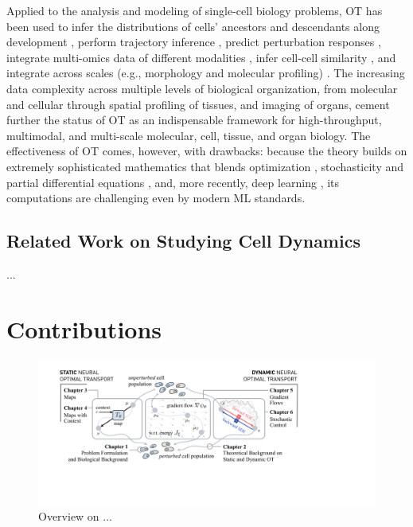 Applied to the analysis and modeling of single-cell biology problems, OT has been used to infer the distributions of cells' ancestors and descendants along development \citep{schiebinger2019optimal}, perform trajectory inference \citep{bunne2022proximal, forrow2021lineageot, bunne2022recovering, lavenant2021towards, schiebinger2019optimal, tong2020trajectorynet, yang2020predicting, zhang2021optimal, chizat2022trajectory}, predict perturbation responses \citep{bunne2021learning, yang2018scalable, lubeck2022neural}, integrate multi-omics data of different modalities \citep{demetci2022scot}, infer cell-cell similarity \citep{huizing2022optimal}, and integrate across scales (e.g., morphology and molecular profiling) \citep{yang2021multi}. The increasing data complexity across multiple levels of biological organization, from molecular and cellular through spatial profiling \citep{moriel2021novosparc} of tissues, and imaging of organs, cement further the status of OT as an indispensable framework for high-throughput, multimodal, and multi-scale molecular, cell, tissue, and organ biology. The effectiveness of OT comes, however, with drawbacks: because the theory builds on extremely sophisticated mathematics that blends optimization \citep{cuturi2013sinkhorn, cuturi2022optimal}, stochasticity \citep{chizat2022trajectory, bunne2022recovering} and partial differential equations \citep{bunne2022proximal}, and, more recently, deep learning \citep{tong2020trajectorynet, bunne2021learning, bunne2022supervised, yang2018scalable, lubeck2022neural, yang2021multi}, its computations are challenging even by modern ML standards.


\subsection{Related Work on Studying Cell Dynamics}

...

\section{Contributions}

\begin{figure}[t]
  \includegraphics[width=\textwidth]{figures/fig_overview_thesis.pdf}
  \caption{Overview on ...}
  \label{fig:overview_thesis}
\end{figure}


